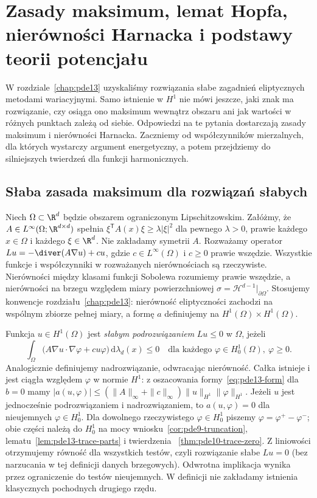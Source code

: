 \chapter[Zasady maksimum i teoria potencjału]{Zasady maksimum, lemat Hopfa, nierówności Harnacka i podstawy teorii potencjału}
\label{chap:pde14}

W rozdziale~\ref{chap:pde13} uzyskaliśmy rozwiązania słabe
zagadnień eliptycznych metodami wariacyjnymi. Samo istnienie w
$H^1$ nie mówi jeszcze, jaki znak ma rozwiązanie, czy osiąga ono
maksimum wewnątrz obszaru ani jak wartości w różnych punktach
zależą od siebie. Odpowiedzi na te pytania dostarczają zasady
maksimum i nierówności Harnacka. Zaczniemy od współczynników
mierzalnych, dla których wystarczy argument energetyczny, a potem
przejdziemy do silniejszych twierdzeń dla funkcji harmonicznych.

\section{Słaba zasada maksimum dla rozwiązań słabych}
\label{sec:pde14-weak}
Niech $\Omega\subset\R^d$ będzie obszarem ograniczonym Lipschitzowskim. Załóżmy, że $A\in L^\infty(\Omega;\R^{d\times d})$
spełnia $\xi^{\mathsf T}A(x)\xi\ge\lambda|\xi|^2$
dla pewnego $\lambda>0$, prawie każdego $x\in\Omega$ i każdego
$\xi\in\R^d$. Nie zakładamy symetrii $A$.
Rozważamy operator $Lu=-\diver(A\nabla u)+cu$, gdzie
$c\in L^\infty(\Omega)$ i $c\ge0$ prawie wszędzie.
Wszystkie funkcje i współczynniki w rozważanych
nierównościach są rzeczywiste. Nierówności między klasami
funkcji Sobolewa rozumiemy prawie wszędzie, a nierówności
na brzegu względem miary powierzchniowej
$\sigma=\mathcal H^{d-1}|_{\partial\Omega}$.
Stosujemy konwencje rozdziału~\ref{chap:pde13}: nierówność
eliptyczności zachodzi na wspólnym zbiorze pełnej miary,
a formę $a$ definiujemy na $H^1(\Omega)\times H^1(\Omega)$.

\begin{definicja}
\label{def:pde14-subsolution}
Funkcja $u\in H^1(\Omega)$ jest \emph{słabym podrozwiązaniem}
$Lu\le0$ w $\Omega$, jeżeli
\[
 \int_\Omega\big(A\nabla u\cdot\nabla\varphi
 +cu\varphi\big)\,\mathrm d\lambda_d(x)\le0
 \quad\text{dla każdego }\varphi\in H_0^1(\Omega),\ \varphi\ge0.
\]
Analogicznie definiujemy nadrozwiązanie, odwracając nierówność.
Całka istnieje i jest ciągła względem $\varphi$ w normie
$H^1$: z oszacowania formy~\eqref{eq:pde13-form} dla $b=0$
mamy
$|a(u,\varphi)|\le(\|A\|_\infty+\|c\|_\infty)
\|u\|_{H^1}\|\varphi\|_{H^1}$.
Jeżeli $u$ jest jednocześnie podrozwiązaniem i nadrozwiązaniem,
to $a(u,\varphi)=0$ dla nieujemnych $\varphi\in H_0^1$.
Dla dowolnego rzeczywistego $\varphi\in H_0^1$ piszemy
$\varphi=\varphi^+-\varphi^-$; obie części należą do $H_0^1$
na mocy wniosku~\ref{cor:pde9-truncation},
lematu~\ref{lem:pde13-trace-parts} i twierdzenia
~\ref{thm:pde10-trace-zero}. Z liniowości otrzymujemy
równość dla wszystkich testów, czyli rozwiązanie słabe
$Lu=0$ (bez narzucania w tej definicji danych brzegowych).
Odwrotna implikacja wynika przez ograniczenie do testów nieujemnych.
W definicji nie zakładamy istnienia klasycznych pochodnych drugiego rzędu.
\end{definicja}

